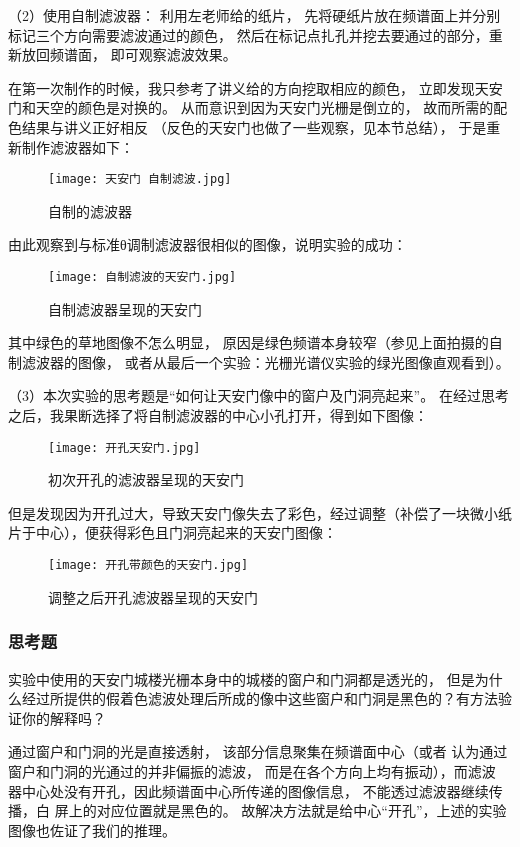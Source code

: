 \documentclass[11pt]{article}
\begin{document}
（2）使用自制滤波器：
利用左老师给的纸片，
先将硬纸片放在频谱面上并分别标记三个方向需要滤波通过的颜色，
然后在标记点扎孔并挖去要通过的部分，重新放回频谱面，
即可观察滤波效果。

在第一次制作的时候，我只参考了讲义给的方向挖取相应的颜色，
立即发现天安门和天空的颜色是对换的。
从而意识到因为天安门光栅是倒立的，
故而所需的配色结果与讲义正好相反
（反色的天安门也做了一些观察，见本节总结），
于是重新制作滤波器如下：

\begin{figure}[H]
    \centering
    \texttt{[image: 天安门 自制滤波.jpg]}
    \caption{自制的滤波器}
\end{figure}

\newpage
由此观察到与标准θ调制滤波器很相似的图像，说明实验的成功：
\begin{figure}[H]
    \centering
    \texttt{[image: 自制滤波的天安门.jpg]}
    \caption{自制滤波器呈现的天安门}
\end{figure}

其中绿色的草地图像不怎么明显，
原因是绿色频谱本身较窄（参见上面拍摄的自制滤波器的图像，
或者从最后一个实验：光栅光谱仪实验的绿光图像直观看到）。

（3）本次实验的思考题是“如何让天安门像中的窗户及门洞亮起来”。
在经过思考之后，我果断选择了将自制滤波器的中心小孔打开，得到如下图像：

\begin{figure}[H]
    \centering
    \texttt{[image: 开孔天安门.jpg]}
    \caption{初次开孔的滤波器呈现的天安门}
\end{figure}

\newpage
但是发现因为开孔过大，导致天安门像失去了彩色，经过调整（补偿了一块微小纸片于中心），便获得彩色且门洞亮起来的天安门图像：

\begin{figure}[H]
    \centering
    \texttt{[image: 开孔带颜色的天安门.jpg]}
    \caption{调整之后开孔滤波器呈现的天安门}
\end{figure}


\subsubsection*{思考题}

实验中使用的天安门城楼光栅本身中的城楼的窗户和门洞都是透光的，
但是为什么经过所提供的假着色滤波处理后所成的像中这些窗户和门洞是黑色的？有方法验证你的解释吗？

通过窗户和门洞的光是直接透射，
该部分信息聚集在频谱面中心（或者
认为通过窗户和门洞的光通过的并非偏振的滤波，
而是在各个方向上均有振动），而滤波
器中心处没有开孔，因此频谱面中心所传递的图像信息，
不能透过滤波器继续传播，白
屏上的对应位置就是黑色的。
故解决方法就是给中心“开孔”，上述的实验图像也佐证了我们的推理。
\end{document}

